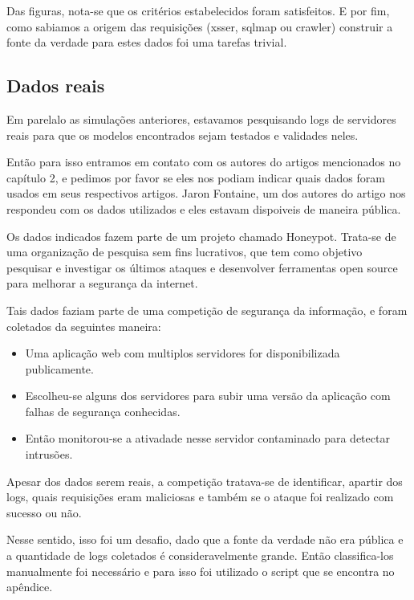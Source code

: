 Das figuras, nota-se que os critérios estabelecidos foram satisfeitos. E por fim, 
como sabiamos a origem das requisições (xsser, sqlmap ou crawler) construir a fonte 
da verdade para estes dados foi uma tarefas trivial.

\subsection{Dados reais}

Em parelalo as simulações anteriores, estavamos pesquisando logs de servidores reais para que os modelos 
encontrados sejam testados e validades neles. 

Então para isso entramos em contato com os autores do artigos mencionados no capítulo 2, e 
pedimos por favor se eles nos podiam indicar quais dados foram usados em seus respectivos artigos. Jaron Fontaine, um dos autores
do artigo \cite{ref:art6} nos respondeu com os dados utilizados e eles estavam dispoiveis de
maneira pública. 

Os dados indicados fazem parte de um projeto chamado Honeypot. Trata-se de uma organização de pesquisa 
sem fins lucrativos, que tem como objetivo pesquisar e investigar os últimos ataques e desenvolver
ferramentas open source para melhorar a segurança da internet.

Tais dados faziam parte de uma competição de segurança da informação, e foram coletados da seguintes maneira:

\begin{itemize}
    \item Uma aplicação web com multiplos servidores for disponibilizada publicamente.
    \item Escolheu-se alguns dos servidores para subir uma versão da aplicação 
    com falhas de segurança conhecidas.
    \item Então monitorou-se a ativadade nesse servidor contaminado para detectar intrusões.
\end{itemize}

Apesar dos dados serem reais, a competição tratava-se de identificar, apartir dos logs, quais requisições 
eram maliciosas e também se o ataque foi realizado com sucesso ou não. 

Nesse sentido, isso foi um desafio, dado que a fonte da verdade não era pública e a quantidade de logs 
coletados é consideravelmente grande. Então classifica-los manualmente foi necessário e para 
isso foi utilizado o script que se encontra no apêndice.

